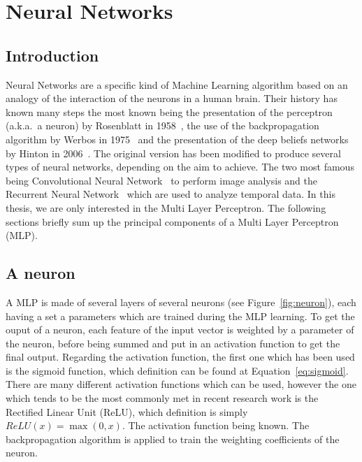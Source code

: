 \section{Neural Networks}
\label{sec:nn}

\subsection{Introduction}

Neural Networks are a specific kind of Machine Learning algorithm based on an analogy of the interaction of the neurons in a human brain. Their history has known many steps the most known being the presentation of the perceptron (a.k.a.\ a neuron) by Rosenblatt in 1958~\cite{rosenblatt1958perceptron}, the use of the backpropagation algorithm by Werbos in 1975~\cite{werbos1974beyond} and the presentation of the deep beliefs networks by Hinton in 2006~\cite{hinton2006fast}. The original version has been modified to produce several types of neural networks, depending on the aim to achieve. The two most famous being Convolutional Neural Network~\cite{krizhevsky2012imagenet} to perform image analysis and the Recurrent Neural Network~\cite{mikolov2010recurrent} which are used to analyze temporal data. In this thesis, we are only interested in the Multi Layer Perceptron. The following sections briefly sum up the principal components of a Multi Layer Perceptron (MLP). 

\subsection{A neuron}

A MLP is made of several layers of several neurons (see Figure~\ref{fig:neuron}), each having a set a parameters which are trained during the MLP learning. To get the ouput of a neuron, each feature of the input vector is weighted by a parameter of the neuron, before being summed and put in an activation function to get the final output. Regarding the activation function, the first one which has been used is the sigmoid function, which definition can be found at Equation~\ref{eq:sigmoid}. There are many different activation functions which can be used, however the one which tends to be the most commonly met in recent research work is the Rectified Linear Unit (ReLU), which definition is simply $ReLU(x) = \max(0, x)$. The activation function being known. The backpropagation algorithm is applied to train the weighting coefficients of the neuron.


